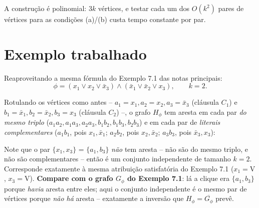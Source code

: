 \documentclass[9pt,a4paper]{extarticle}
\newcommand{\impt}[1]{\textcolor{important}{\textbf{#1}}}
\theoremstyle{definition}
\begin{document}
A construção é polinomial: \(3k\) vértices, e testar cada um dos \(O(k^2)\) pares de vértices para as condições (a)/(b) custa tempo constante por par.

\section{Exemplo trabalhado}

Reaproveitando a mesma fórmula do Exemplo 7.1 das notas principais:
\[
\phi = (x_1 \vee x_2 \vee \bar x_3) \wedge (\bar x_1 \vee \bar x_2 \vee x_3), \qquad k = 2.
\]

Rotulando os vértices como antes -- \(a_1{=}x_1, a_2{=}x_2, a_3{=}\bar x_3\) (cláusula \(C_1\)) e \(b_1{=}\bar x_1, b_2{=}\bar x_2, b_3{=}x_3\) (cláusula \(C_2\)) --, o grafo \(H_\phi\) tem aresta em cada par \emph{do mesmo triplo} (\(a_1a_2, a_1a_3, a_2a_3, b_1b_2, b_1b_3, b_2b_3\)) e em cada par de \emph{literais complementares} (\(a_1b_1\), pois \(x_1,\bar x_1\); \(a_2b_2\), pois \(x_2,\bar x_2\); \(a_3b_3\), pois \(\bar x_3,x_3\)):

\begin{center}
\end{center}

Note que o par \(\{x_1, x_3\}\) = \(\{a_1, b_3\}\) \emph{não} tem aresta -- não são do mesmo triplo, e não são complementares -- então é um conjunto independente de tamanho \(k=2\). Corresponde exatamente à mesma atribuição satisfatória do Exemplo 7.1 (\(x_1=\mathrm{V}\), \(x_3=\mathrm{V}\)). \impt{Compare com o grafo \(G_\phi\) do Exemplo 7.1}: lá a clique era \(\{a_1,b_3\}\) porque \emph{havia} aresta entre eles; aqui o conjunto independente é o mesmo par de vértices porque \emph{não há} aresta -- exatamente a inversão que \(H_\phi = \overline{G_\phi}\) prevê.
\end{document}
